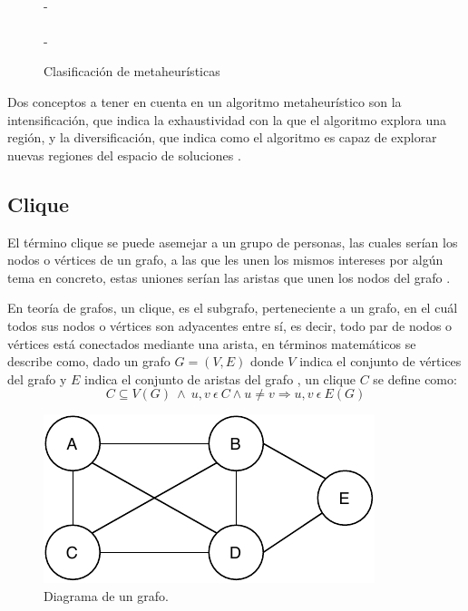 \begin{figure}[H]
{{{			}\\
			- \\
		}\\
		- \\
	}
	\caption{Clasificación de metaheurísticas}
	\label{fig:clasif-metahs}
\end{figure}

Dos conceptos a tener en cuenta en un algoritmo metaheurístico son la intensificación, que indica la exhaustividad con la que el algoritmo explora una región, y la diversificación, que indica como el algoritmo es capaz de explorar nuevas regiones del espacio de soluciones \cite{libro-metaheuristicas}.

\subsection{Clique}
\label{sec-clique}
El término clique se puede asemejar a un grupo de personas, las cuales serían los nodos o vértices de un grafo, a las que les unen los mismos intereses por algún tema en concreto, estas uniones serían las aristas que unen los nodos del grafo \cite{LUCE:1949}.

En teoría de grafos, un clique, es el subgrafo, perteneciente a un grafo, en el cuál todos sus nodos o vértices son adyacentes entre sí, es decir, todo par de nodos o vértices está conectados mediante una arista, en términos matemáticos se describe como, dado un grafo $G = (V, E)$ donde $V$ indica el conjunto de vértices del grafo y $E$ indica el conjunto de aristas del grafo \cite{web-clique}, un clique $C$ se define como:
\[
C \subseteq V(G) ~ \wedge ~ u, v ~ \epsilon ~ C  \wedge  u  \neq v \Rightarrow u, v ~ \epsilon ~ E(G)
\]

\begin{figure}[H]
	\centering
	\includegraphics{Figures/graph.pdf}
	\caption{Diagrama de un grafo.}
	\label{fig:graph}
\end{figure}

